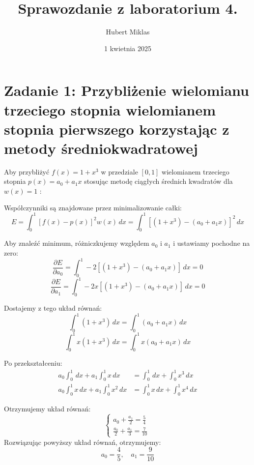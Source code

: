 \documentclass{article}
\title{Sprawozdanie z laboratorium 4.}
\author{Hubert Miklas}
\date{1 kwietnia 2025}
\begin{document}
\maketitle

\section{Zadanie 1: Przybliżenie wielomianu trzeciego stopnia wielomianem stopnia pierwszego korzystając z metody średniokwadratowej}

Aby przybliżyć $f(x) = 1 + x^3$ w przedziale $[0,1]$ wielomianem trzeciego stopnia $p(x) = a_0 + a_1x$ stosując metodę ciągłych średnich kwadratów dla $w(x) = 1$ \cite{Funika}:

Współczynniki są znajdowane przez minimalizowanie całki:
\begin{equation}
E = \int_0^1 [f(x) - p(x)]^2 w(x) \, dx = \int_0^1 [(1 + x^3) - (a_0 + a_1x)]^2 \, dx
\end{equation}

Aby znaleźć minimum, różniczkujemy względem $a_0$ i $a_1$ i ustawiamy pochodne na zero:
\begin{equation}
\frac{\partial E}{\partial a_0} = \int_0^1 -2[(1 + x^3) - (a_0 + a_1x)] \, dx = 0
\end{equation}
\begin{equation}
\frac{\partial E}{\partial a_1} = \int_0^1 -2x[(1 + x^3) - (a_0 + a_1x)] \, dx = 0
\end{equation}

Dostajemy z tego układ równań:
\begin{equation}
\int_0^1 (1 + x^3) \, dx = \int_0^1 (a_0 + a_1x) \, dx
\end{equation}
\begin{equation}
\int_0^1 x(1 + x^3) \, dx = \int_0^1 x(a_0 + a_1x) \, dx
\end{equation}

Po przekształceniu:
\begin{align*}
a_0 \int_0^1 \, dx + a_1 \int_0^1 x \, dx &= \int_0^1 \, dx + \int_0^1 x^3 \, dx \\
a_0 \int_0^1 x \, dx + a_1 \int_0^1 x^2 \, dx &= \int_0^1 x \, dx + \int_0^1 x^4 \, dx
\end{align*}

Otrzymujemy układ równań:
\begin{equation}
    \begin{cases}
      a_0 + \frac{a_1}{2} =  \frac{5}{4}\\
      \frac{a_0}{2} + \frac{a_1}{3} = \frac{7}{10}      
    \end{cases}\,
\end{equation}
Rozwiązując powyższy układ równań, otrzymujemy:
\begin{equation}
a_0 = \frac{4}{5}, \quad a_1 = \frac{9}{10}
\end{equation}
\end{document}
